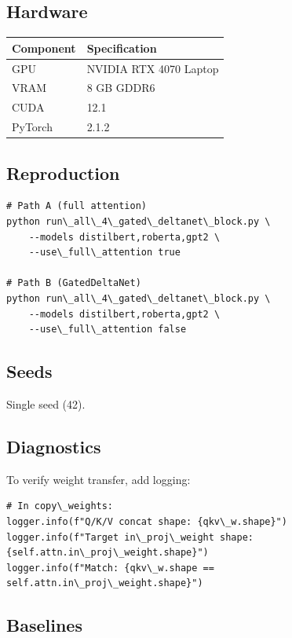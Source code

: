 \subsection{Hardware}

\begin{table}[H]
\centering
\small
\begin{tabular}{ll}
\toprule
\textbf{Component} & \textbf{Specification} \\
\midrule
GPU & NVIDIA RTX 4070 Laptop \\
VRAM & 8 GB GDDR6 \\
CUDA & 12.1 \\
PyTorch & 2.1.2 \\
\bottomrule
\end{tabular}
\end{table}

\subsection{Reproduction}

\begin{lstlisting}
# Path A (full attention)
python run\_all\_4\_gated\_deltanet\_block.py \
    --models distilbert,roberta,gpt2 \
    --use\_full\_attention true

# Path B (GatedDeltaNet)
python run\_all\_4\_gated\_deltanet\_block.py \
    --models distilbert,roberta,gpt2 \
    --use\_full\_attention false
\end{lstlisting}

\subsection{Seeds}

Single seed (42).

\subsection{Diagnostics}

To verify weight transfer, add logging:

\begin{lstlisting}
# In copy\_weights:
logger.info(f"Q/K/V concat shape: {qkv\_w.shape}")
logger.info(f"Target in\_proj\_weight shape: {self.attn.in\_proj\_weight.shape}")
logger.info(f"Match: {qkv\_w.shape == self.attn.in\_proj\_weight.shape}")
\end{lstlisting}

\subsection{Baselines}

